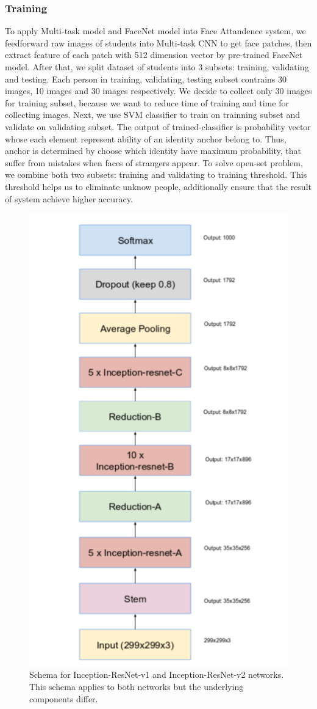 \documentclass[journal, twocolumn]{IEEEtran}
\begin{document}
\subsubsection{Training} 
To apply Multi-task model and FaceNet model into Face Attandence system, we feedforward raw images of students into Multi-task CNN to get face patches, then extract feature of each patch with 512 dimension vector by pre-trained FaceNet model. After that, we split dataset of students into 3 subsets: training, validating and testing. Each person in training, validating, testing subset contrains 30 images, 10 images and 30 images respectively. We decide to collect only 30 images for training subset, because we want to reduce time of training and time for collecting images. Next, we use SVM classifier to train on trainning subset and validate on validating subset. The output of trained-classifier is probability vector whose each element represent ability of an identity anchor belong to. Thus, anchor is determined by choose which identity have maximum probability, that suffer from mistakes when faces of strangers appear. To solve open-set problem, we combine both two subsets: training and validating to training threshold. This threshold helps us to eliminate unknow people, additionally ensure that the result of system achieve higher accuracy.
\begin{figure}
    \centering
    \includegraphics[width=0.7\linewidth]{img/in_res_v1.png}
	\caption{Schema for Inception-ResNet-v1 and Inception-ResNet-v2 networks. This schema applies to both networks but the underlying components differ.}
	\label{fig:inception-resnet}
\end{figure}
\end{document}
